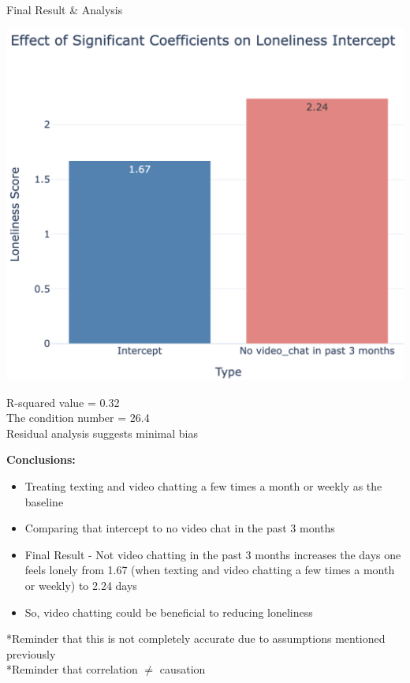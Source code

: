 \documentclass{beamer}
\begin{document}
\begin{frame}{Final Result \& Analysis}

\begin{minipage}[t]{0.6\linewidth} %
    \includegraphics[width=\linewidth]{Screenshot 2024-12-01 at 1.08.25 PM.png}
\end{minipage}%
R-squared value = 0.32\\
The condition number = 26.4\\
Residual analysis suggests minimal bias\\

\end{frame}

\begin{frame}
\textbf{Conclusions:}\\
\begin{itemize}
    \item  Treating texting and video chatting a few times a month or weekly as the baseline
    \item Comparing that intercept to no video chat in the past 3 months
    \item Final Result - Not video chatting in the past 3 months increases the days one feels lonely from 1.67 (when texting and video chatting a few times a month or weekly) to 2.24 days\\
    \item So, video chatting could be beneficial to reducing loneliness 
\end{itemize}

*Reminder that this is not completely accurate due to assumptions mentioned previously\\
*Reminder that correlation $\neq$ causation
\end{frame}
\end{document}
